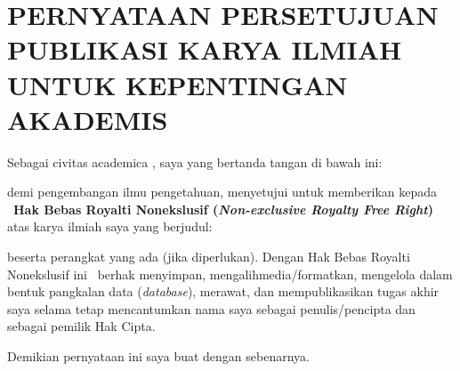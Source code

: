 
\chapter*{PERNYATAAN PERSETUJUAN PUBLIKASI KARYA ILMIAH\\UNTUK KEPENTINGAN AKADEMIS}

Sebagai civitas academica \thesisUniversitasNama, saya yang bertanda
tangan di bawah ini:

\vspace{4mm}
\begin{fieldlist}
\end{fieldlist}

\vspace{4mm}
\noindent demi pengembangan ilmu pengetahuan, menyetujui untuk memberikan
kepada \thesisUniversitasNama\ \textbf{Hak Bebas Royalti Nonekslusif
(\textit{Non-exclusive Royalty Free Right})} atas karya ilmiah saya
yang berjudul:

\begin{center}
  \textbf{\MakeUppercase{\thesisTitle}}
\end{center}

\noindent beserta perangkat yang ada (jika diperlukan). Dengan Hak Bebas Royalti
Nonekslusif ini \thesisUniversitasNama\ berhak menyimpan,
mengalihmedia/formatkan, mengelola dalam bentuk pangkalan data
(\textit{database}), merawat, dan mempublikasikan tugas akhir saya
selama tetap mencantumkan nama saya sebagai penulis/pencipta dan
sebagai pemilik Hak Cipta.

\noindent Demikian pernyataan ini saya buat dengan sebenarnya.

\baselineskip
\noindent\hfill%
\begin{minipage}[t]{0.45\linewidth}
\signOff{\thesisAuthor}{\thesisNim}
\end{minipage}
